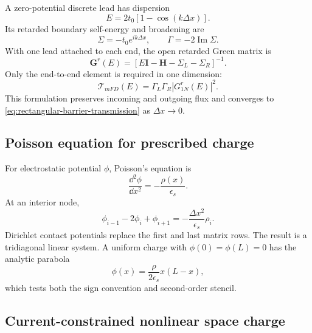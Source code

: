 A zero-potential discrete lead has dispersion
\begin{equation}
  E=2t_0[1-\cos(k\Delta x)].
  \label{eq:discrete-lead-dispersion}
\end{equation}
Its retarded boundary self-energy and broadening are
\begin{equation}
  \Sigma=-t_0e^{ik\Delta x},
  \qquad
  \Gamma=-2\operatorname{Im}\Sigma.
  \label{eq:discrete-lead-self-energy}
\end{equation}
With one lead attached to each end, the open retarded Green matrix is
\begin{equation}
  \bm G^r(E)=
  \left[E\bm I-\bm H-\Sigma_L-\Sigma_R\right]^{-1}.
  \label{eq:barrier-retarded-green-matrix}
\end{equation}
Only the end-to-end element is required in one dimension:
\begin{equation}
  \boxed{
  \mathcal T_{
m FD}(E)
  =\Gamma_L\Gamma_R\left|G^r_{1N}(E)\right|^2.
  }
  \label{eq:barrier-fd-transmission}
\end{equation}
This formulation preserves incoming and outgoing flux and converges to
\cref{eq:rectangular-barrier-transmission} as $\Delta x\to0$.

\subsection{Poisson equation for prescribed charge}

For electrostatic potential $\phi$, Poisson's equation is
\begin{equation}
  \frac{\dd^2\phi}{\dd x^2}=-\frac{\rho(x)}{\epsilon_s}.
  \label{eq:poisson-potential-one-dimensional}
\end{equation}
At an interior node,
\begin{equation}
  \phi_{i-1}-2\phi_i+\phi_{i+1}
  =-\frac{\Delta x^2}{\epsilon_s}\rho_i.
  \label{eq:poisson-centered-difference}
\end{equation}
Dirichlet contact potentials replace the first and last matrix rows.  The
result is a tridiagonal linear system.  A uniform charge with
$\phi(0)=\phi(L)=0$ has the analytic parabola
\begin{equation}
  \phi(x)=\frac{\rho}{2\epsilon_s}x(L-x),
  \label{eq:uniform-charge-potential}
\end{equation}
which tests both the sign convention and second-order stencil.

\subsection{Current-constrained nonlinear space charge}

